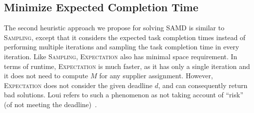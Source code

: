 \documentclass[letterpaper]{article} %
\newcommand{\tuple}[1]{\langle#1\rangle}
\newcommand{\samd}{\ac{SAMD}\xspace}
\newcommand{\sampling}{\textsc{Sampling}\xspace}
\newcommand{\expectation}{\textsc{Expectation}\xspace}
\begin{document}
{%



 

\subsection{Minimize Expected Completion Time}\label{sec:expect}


The second heuristic approach we propose for solving \samd is 
similar to \sampling, except that it considers the expected task completion times instead of performing multiple iterations and sampling the task completion time in every iteration. 
Like \sampling, \expectation also has minimal space requirement. In terms of runtime, \expectation is much faster, as it has only a single iteration and it does not need to compute $M$ for any supplier assignment. However, \expectation does not consider the given deadline $d$, and can consequently return bad solutions. Loui refers to such a phenomenon as not taking account of ``risk'' (of not meeting the deadline)~\cite{loui1983optimal}.

}
\end{document}
